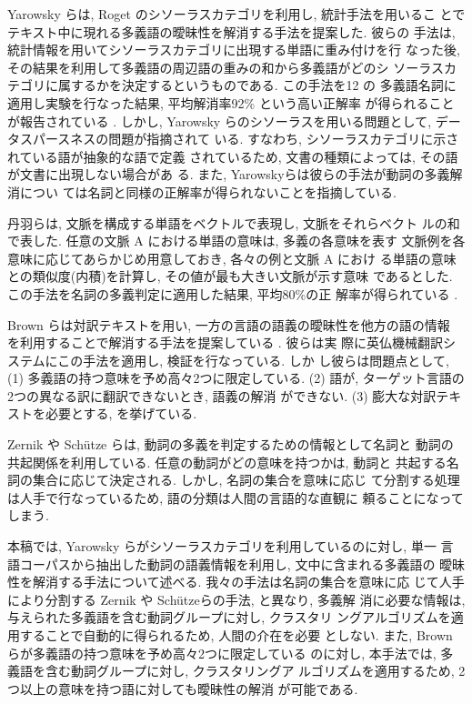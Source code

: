 Yarowsky らは, Roget のシソーラスカテゴリを利用し, 統計手法を用いるこ
とでテキスト中に現れる多義語の曖昧性を解消する手法を提案した.  彼らの
手法は, 統計情報を用いてシソーラスカテゴリに出現する単語に重み付けを行
なった後, その結果を利用して多義語の周辺語の重みの和から多義語がどのシ
ソーラスカテゴリに属するかを決定するというものである.  この手法を12 の
多義語名詞に適用し実験を行なった結果, 平均解消率92\% という高い正解率
が得られることが報告されている \cite{Yarowsky1992}.  しかし, Yarowsky 
らのシソーラスを用いる問題として, データスパースネスの問題が指摘されて
いる.  すなわち, シソーラスカテゴリに示されている語が抽象的な語で定義
されているため, 文書の種類によっては, その語が文書に出現しない場合があ
る\cite{Niwa1995}. また, Yarowskyらは彼らの手法が動詞の多義解消につい
ては名詞と同様の正解率が得られないことを指摘している.

丹羽らは, 文脈を構成する単語をベクトルで表現し, 文脈をそれらベクト
ルの和で表した.  任意の文脈 A における単語の意味は, 多義の各意味を表す
文脈例を各意味に応じてあらかじめ用意しておき, 各々の例と文脈 A におけ
る単語の意味との類似度(内積)を計算し, その値が最も大きい文脈が示す意味
であるとした.  この手法を名詞の多義判定に適用した結果, 平均80\%の正
解率が得られている \cite{Niwa1994}.

Brown らは対訳テキストを用い, 一方の言語の語義の曖昧性を他方の語の情報
を利用することで解消する手法を提案している \cite{Brown1991}.  彼らは実
際に英仏機械翻訳システムにこの手法を適用し, 検証を行なっている.  しか
し彼らは問題点として, (1) 多義語の持つ意味を予め高々2つに限定している. 
(2) 語が, ターゲット言語の2つの異なる訳に翻訳できないとき, 語義の解消
ができない. (3) 膨大な対訳テキストを必要とする, を挙げている.

Zernik や Sch\"{u}tze らは, 動詞の多義を判定するための情報として名詞と
動詞の共起関係を利用している.  任意の動詞がどの意味を持つかは, 動詞と
共起する名詞の集合に応じて決定される.  しかし, 名詞の集合を意味に応じ
て分割する処理は人手で行なっているため, 語の分類は人間の言語的な直観に
頼ることになってしまう.

本稿では, Yarowsky らがシソーラスカテゴリを利用しているのに対し, 単一
言語コーパスから抽出した動詞の語義情報を利用し, 文中に含まれる多義語の
曖昧性を解消する手法について述べる.  我々の手法は名詞の集合を意味に応
じて人手により分割する Zernik や Sch\"{u}tzeらの手法, と異なり, 多義解
消に必要な情報は, 与えられた多義語を含む動詞グループに対し, クラスタリ
ングアルゴリズムを適用することで自動的に得られるため, 人間の介在を必要
としない.  また, Brown らが多義語の持つ意味を予め高々2つに限定している
のに対し, 本手法では, 多義語を含む動詞グループに対し, クラスタリングア
ルゴリズムを適用するため, 2つ以上の意味を持つ語に対しても曖昧性の解消
が可能である.


